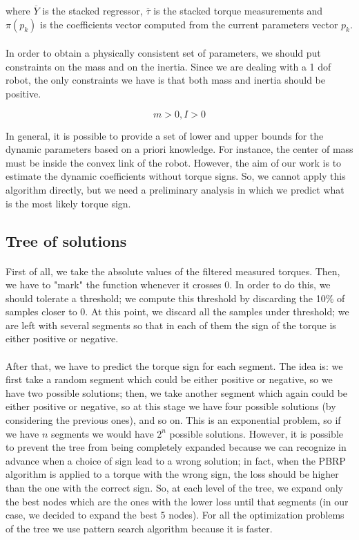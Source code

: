 \documentclass{article}
\begin{document}
\noindent where $\overline{Y}$ is the stacked regressor, $\overline{\tau}$ is the stacked  torque measurements and $\pi(p_k)$ is the coefficients vector computed from the current parameters vector $p_k$.

\paragraph{}In order to obtain a physically consistent set of parameters, we should put constraints on the mass and on the inertia. Since we are dealing with a 1 dof robot, the only constraints we have is that both mass and inertia should be positive.

\[m > 0, I > 0\]

In general, it is possible to provide a set of lower and upper bounds for the dynamic parameters based on a priori knowledge. For instance, the center of mass must be inside the convex link of the robot. However, the aim of our work is to estimate the dynamic coefficients without torque signs. So, we cannot apply this algorithm directly, but we need a preliminary analysis in which we predict what is the most likely torque sign.

\subsection{Tree of solutions}
\paragraph{}First of all, we take the absolute values of the filtered measured torques. Then, we have to "mark" the function whenever it crosses 0. In order to do this, we should tolerate a threshold; we compute this threshold by discarding the 10\% of samples closer to 0. At this point, we discard all the samples under threshold; we are left with several segments so that in each of them the sign of the torque is either positive or negative.
\paragraph{}After that, we have to predict the torque sign for each segment. The idea is: we first take a random segment which could be either positive or negative, so we have two possible solutions; then, we take another segment which again could be either positive or negative, so at this stage we have four possible solutions (by considering the previous ones), and so on. This is an exponential problem, so if we have $n$ segments we would have $2^n$ possible solutions. However, it is possible to prevent the tree from being completely expanded because we can recognize in advance when a choice of sign lead to a wrong solution; in fact, when the PBRP algorithm is applied to a torque with the wrong sign, the loss should be higher than the one with the correct sign. So, at each level of the tree, we expand only the best nodes which are the ones with the lower loss until that segments (in our case, we decided to expand the best 5 nodes). For all the optimization problems of the tree we use pattern search algorithm because it is faster.
\end{document}
